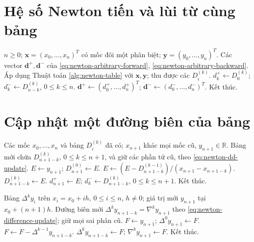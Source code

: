 \documentclass[12pt,a4paper,oneside]{book}
\numberwithin{algorithm}{chapter}
\theoremstyle{definition}
\newcommand{\R}{\mathbb{R}}
\begin{document}
\section{Hệ số Newton tiến và lùi từ cùng bảng}
\begin{algorithm}[H]
\caption{Lấy hai vector hệ số Newton trên các mốc bất kỳ}
\label{alg:newton-two-directions}
\begin{algorithmic}[1]
\Require $n\geq0$; $\boldsymbol x=(x_0,\ldots,x_n)^T$ có mốc đôi một phân biệt; $\boldsymbol y=(y_0,\ldots,y_n)^T$.
\Ensure Các vector $\boldsymbol d^+,\boldsymbol d^-$ của \eqref{eq:newton-arbitrary-forward}, \eqref{eq:newton-arbitrary-backward}.
\State Áp dụng Thuật toán \ref{alg:newton-table} với $\boldsymbol x,\boldsymbol y$; thu được các $D_i^{(k)}$.
\State $d_k^+\gets D_0^{(k)}$; $d_k^-\gets D_{n-k}^{(k)}$, $0\leq k\leq n$.
\State $\boldsymbol d^+\gets(d_0^+,\ldots,d_n^+)^T$; $\boldsymbol d^-\gets(d_0^-,\ldots,d_n^-)^T$.
\State Kết thúc.
\end{algorithmic}
\end{algorithm}

\section{Cập nhật một đường biên của bảng}
\begin{algorithm}[H]
\caption{Thêm một mốc vào bảng tỷ sai phân}
\label{alg:newton-dd-update}
\begin{algorithmic}[1]
\Require Các mốc $x_0,\ldots,x_n$ và bảng $D_i^{(k)}$ đã có; $x_{n+1}$ khác mọi mốc cũ, $y_{n+1}\in\R$.
\Ensure Bảng mới chứa $D_{n+1-k}^{(k)}$, $0\leq k\leq n+1$, và giữ các phần tử cũ, theo \eqref{eq:newton-dd-update}.
\State $E\gets y_{n+1}$; $D_{n+1}^{(0)}\gets E$.
  \State $E\gets(E-D_{n+1-k}^{(k-1)})/(x_{n+1}-x_{n+1-k})$.
  \State $D_{n+1-k}^{(k)}\gets E$.
\EndFor
\Statex
\State $d_{n+1}^+\gets E$; $d_k^-\gets D_{n+1-k}^{(k)}$, $0\leq k\leq n+1$.
\State Kết thúc.
\end{algorithmic}
\end{algorithm}

\begin{algorithm}[H]
\caption{Thêm một mốc vào bảng sai phân cách đều}
\label{alg:newton-difference-update}
\begin{algorithmic}[1]
\Require Bảng $\Delta^ky_i$ trên $x_i=x_0+ih$, $0\leq i\leq n$, $h\ne0$; giá trị mới $y_{n+1}$ tại $x_0+(n+1)h$.
\Ensure Đường biên mới $\Delta^ky_{n+1-k}=\nabla^ky_{n+1}$ theo \eqref{eq:newton-difference-update}; giữ mọi sai phân cũ.
\State $F\gets y_{n+1}$; $\Delta^0y_{n+1}\gets F$.
  \State $F\gets F-\Delta^{k-1}y_{n+1-k}$.
  \State $\Delta^ky_{n+1-k}\gets F$; $\nabla^ky_{n+1}\gets F$.
\EndFor
\Statex
\State Kết thúc.
\end{algorithmic}
\end{algorithm}
\end{document}
